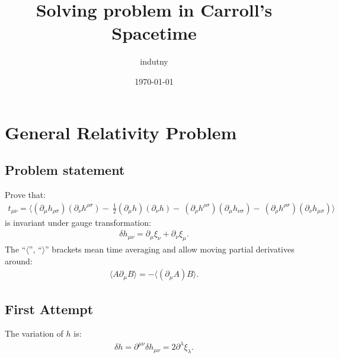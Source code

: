 \documentclass[aps,prd,preprint]{revtex4-1}
\begin{document}
\title{Solving problem in Carroll's Spacetime}
\author{indutny}
\date{\today}
\noaffiliation

\maketitle

\section{General Relativity Problem}

\subsection{Problem statement}

Prove that:
\begin{align}\label{eq:problem}
t_{\mu\nu} = \langle \left( \partial_\mu h_{\rho \sigma} \right) \left( \partial_\nu h^{\rho \sigma} \right) - \
  \frac{1}{2} \left( \partial_\mu h \right) \left( \partial_\nu h \right) - \
  \left( \partial_\rho h^{\rho \sigma} \right) \left( \partial_\mu h_{\nu \sigma} \right) - \
  \left( \partial_\rho h^{\rho \sigma} \right) \left( \partial_\nu h_{\mu \sigma} \right) \rangle
\end{align}
is invariant under gauge transformation:
\begin{align}\label{eq:metric-var}
\delta h_{\mu\nu} = \partial_\mu \xi_\nu + \partial_\nu \xi_\mu.
\end{align}
The ``$\langle$'', ``$\rangle$'' brackets mean time averaging and allow moving partial derivatives around:
\begin{align}
\langle A \partial_\mu B \rangle = - \langle \left( \partial_\mu A \right) B \rangle.
\end{align}

\subsection{First Attempt}

The variation of $h$ is:
\begin{align}\label{eq:trace-var}
\delta h =  \partial^{\mu\nu} \delta h_{\mu\nu} = 2 \partial^\lambda \xi_\lambda.
\end{align}
\end{document}
